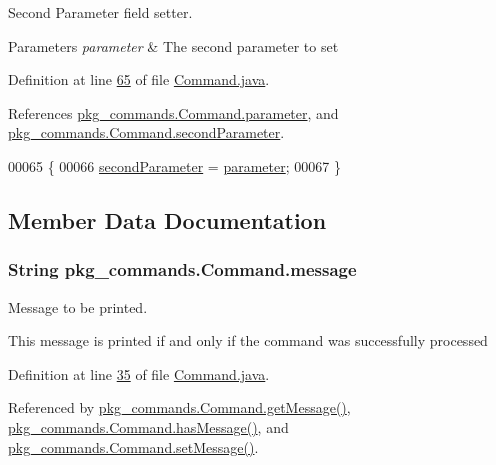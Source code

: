 Second Parameter field setter. 


\begin{DoxyParams}{Parameters}
{\em parameter} & The second parameter to set \\
\hline
\end{DoxyParams}


Definition at line \hyperlink{Command_8java_source_l00065}{65} of file \hyperlink{Command_8java_source}{Command.\-java}.



References \hyperlink{Command_8java_source_l00021}{pkg\-\_\-commands.\-Command.\-parameter}, and \hyperlink{Command_8java_source_l00028}{pkg\-\_\-commands.\-Command.\-second\-Parameter}.


\begin{DoxyCode}
00065                                                      \{
00066         \hyperlink{classpkg__commands_1_1Command_a5f0b6df5ba798c9ee4446f01a0352210}{secondParameter} = \hyperlink{classpkg__commands_1_1Command_a089fe1b30b43b2ad5f0dcb2f0ffc2fdd}{parameter};
00067     \}
\end{DoxyCode}


\subsection{Member Data Documentation}
\hypertarget{classpkg__commands_1_1Command_ab4bc9d76fd948fcf253400793fbfde3f}{
\subsubsection[{message}]{\setlength{\rightskip}{0pt plus 5cm}String pkg\-\_\-commands.\-Command.\-message\hspace{0.3cm}{\ttfamily [private]}}}\label{classpkg__commands_1_1Command_ab4bc9d76fd948fcf253400793fbfde3f}


Message to be printed. 

This message is printed if and only if the command was successfully processed 

Definition at line \hyperlink{Command_8java_source_l00035}{35} of file \hyperlink{Command_8java_source}{Command.\-java}.



Referenced by \hyperlink{Command_8java_source_l00097}{pkg\-\_\-commands.\-Command.\-get\-Message()}, \hyperlink{Command_8java_source_l00105}{pkg\-\_\-commands.\-Command.\-has\-Message()}, and \hyperlink{Command_8java_source_l00089}{pkg\-\_\-commands.\-Command.\-set\-Message()}.

